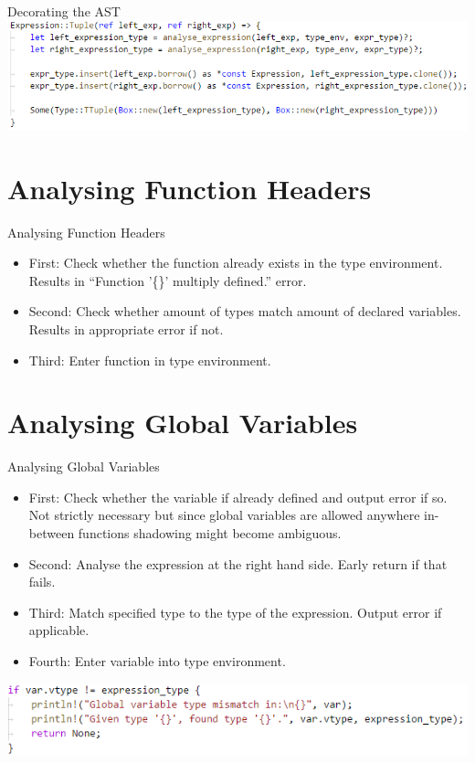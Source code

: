 \documentclass[10pt]{beamer}
\begin{document}
\begin{frame}{Decorating the AST}
    \includegraphics[width=\textwidth]{presentation2/expr_tuple.png}
\end{frame}
    
\section{Analysing Function Headers}
\begin{frame}{Analysing Function Headers}
    \begin{itemize}
        \item First: Check whether the function already exists in the type environment. Results in ``Function '\{\}' multiply defined.'' error.
        \item Second: Check whether amount of types match amount of declared variables. Results in appropriate error if not.
        \item Third: Enter function in type environment.
    \end{itemize}
\end{frame}

\section{Analysing Global Variables}
\begin{frame}{Analysing Global Variables}
    \begin{itemize}
        \item First: Check whether the variable if already defined and output error if so. Not strictly necessary but since global variables are allowed anywhere in-between functions shadowing might become ambiguous.
        \item Second: Analyse the expression at the right hand side. Early return if that fails.
        \item Third: Match specified type to the type of the expression. Output error if applicable.
        \item Fourth: Enter variable into type environment.
    \end{itemize}
    \includegraphics[width=\textwidth]{presentation2/global_var_mismatch.png}
\end{frame}
\end{document}
